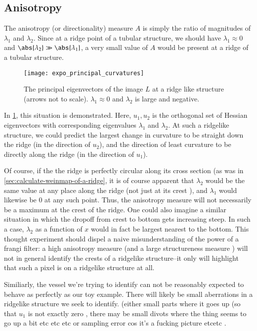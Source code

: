\subsection{Anisotropy}
The anisotropy (or directionality) measure $A$ is simply the ratio of magnitudes of $\lambda_1$ and $\lambda_2$. Since at a ridge point of a tubular structure, we should have $\lambda_1 \approx 0$ and $\abs{\lambda_2} \gg \abs{\lambda_1}$,
a very small value of $A$ would be present at a ridge of a tubular structure.

\begin{figure}[h] \label{fig:expo-principal-curvatures}
	\begin{center}
\texttt{[image: expo\_principal\_curvatures]}
\caption{The principal eigenvectors of the image $L$ at a ridge like structure (arrows not to scale). $\lambda_1 \approx 0$ and $\lambda_2$ is large and negative. }
\end{center}
\end{figure}

In \cref{fig:expo-principal-curvatures}, this situation is demonstrated. Here, $u_1, u_2$ is the orthogonal set of Hessian eigenvectors with corresponding eigenvalues $\lambda_1$ and $\lambda_2$. At such a ridgelike structure, we could predict the largest change in curvature to be straight down the ridge (in the direction of $u_2$), and the direction of least curvature to be directly along the ridge (in the direction  of $u_1$).

Of course, if the the ridge is perfectly circular along its cross section (as was in \cref{sec:calculate-weinmap-of-a-ridge}, it is of course apparent that $\lambda_2$ would be the same value at any place along the ridge (not just at its crest ), and $\lambda_1$ would likewise be 0 at any such point. Thus, the anisotropy measure will not necessarily be a maximum at the crest of the ridge. One could also imagine a similar situation in which the dropoff from crest to bottom gets increasing steep. In such a case, $\lambda_2$ as a function of $x$ would in fact be largest nearest to the bottom. This thought experiment should dispel a naive misunderstanding of the power of a frangi filter: a high anisotropy measure (and a large structureness measure ) will not in general identify the crests of a ridgelike structure--it only will highlight that such a pixel is on a ridgelike structure at all.

Similiarly, the vessel we're trying to identify can not be reasonably expected to behave as perfectly as our toy example. There will likely be small aberrations in a ridgelike structure we seek to identify.  (either small parts where it goes up (so that $u_1$ is not exactly zero , there may be small divots where the thing seems to go up a bit etc etc etc or sampling error cos it's a fucking picture etcetc .

